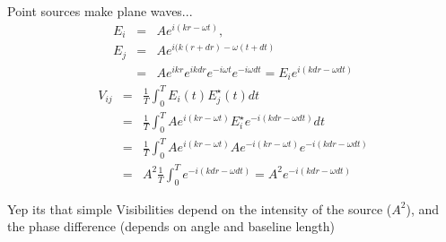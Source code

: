 \documentclass[ignorenonframetext]{beamer}
\begin{document}
\begin{frame}
Point sources make plane waves...
 \begin{eqnarray*}
E_i & = & A e^{i (k r - \omega t)}, \\
E_j & = & A e^{i (k (r + dr) - \omega (t+dt)} \\
    & = & A e^{ikr} e^{ik d r} e^{-i \omega t}e^{-i \omega d t} = E_i e^{i (k dr - \omega dt)}
 \end{eqnarray*}
 \begin{eqnarray*}
  V_{ij} & = & \frac{1}{T} \int_0^T E_i(t) E_j^{\star}(t) dt \\
   & = & \frac{1}{T} \int_0^T A e^{i (k r - \omega t)} E_i^{\star} e^{-i (k dr - \omega dt)} dt \\
   & = & \frac{1}{T} \int_0^T A e^{i (k r - \omega t)} A e^{-i (k r - \omega t)}  e^{-i (k dr - \omega dt)} \\
   & = & A^2 \frac{1}{T} \int_0^T e^{-i (k dr - \omega dt)} = A^2 e^{-i (k dr - \omega dt)}
 \end{eqnarray*}
 \begin{block}{Yep its that simple}
  Visibilities depend on the intensity of the source ($A^2$), and the phase difference (depends on angle and baseline length)
 \end{block}
\end{frame}
\end{document}

